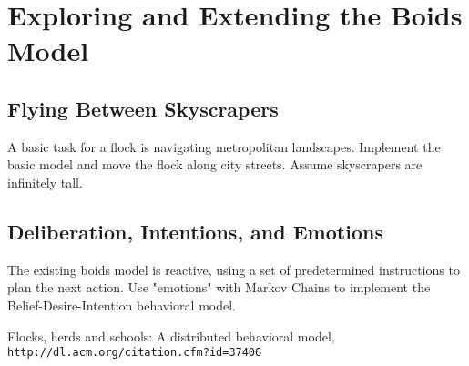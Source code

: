 \documentclass{article}
\begin{document}
\section{Exploring and Extending the Boids Model}

\subsection{Flying Between Skyscrapers}

A basic task for a flock is navigating metropolitan landscapes. Implement the
basic model and move the flock along city streets. Assume skyscrapers are
infinitely tall.

\subsection{Deliberation, Intentions, and Emotions}

The existing boids model is reactive, using a set of predetermined instructions
to plan the next action. Use "emotions" with Markov Chains to implement
the Belief-Desire-Intention behavioral model.

\begin{thebibliography}{9}
Flocks, herds and schools: A distributed behavioral model,
\\\texttt{http://dl.acm.org/citation.cfm?id=37406}
\end{thebibliography}
\end{document}
